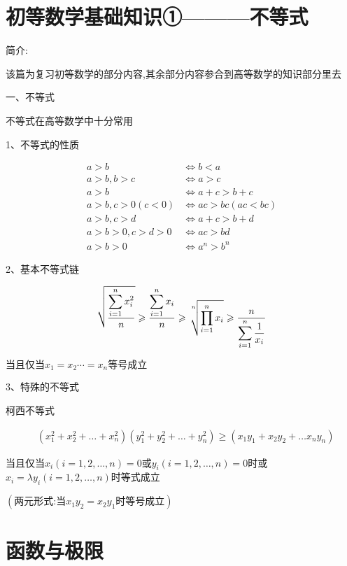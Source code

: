 \documentclass[utf8]{ctexart}
\begin{document}
\linespread{2}

\section*{\heiti 初等数学基础知识①———不等式 }

简介:

该篇为复习初等数学的部分内容,其余部分内容参合到高等数学的知识部分里去

一、不等式

不等式在高等数学中十分常用

1、不等式的性质

\begin{align}
    a>b&\Leftrightarrow b<a\\
    a>b,b>c&\Leftrightarrow a>c\\
    a>b&\Leftrightarrow a+c>b+c\\
    a>b,c>0(c<0)&\Leftrightarrow ac>bc(ac<bc)\\
    a>b,c>d&\Leftrightarrow a+c>b+d\\
    a>b>0,c>d>0&\Leftrightarrow ac>bd\\
    a>b>0&\Leftrightarrow a^{n}>b^{n}
\end{align}

2、基本不等式链

\begin{align}
    \displaystyle\sqrt{\frac{\displaystyle\sum^{n}_{i=1}x_{i}^{2}}{n}}\geqslant\frac{\displaystyle\sum^{n}_{i=1}x_{i}}{n}\geqslant \sqrt[\uproot{16}n]{\displaystyle\prod ^{n}_{i=1}x_{i}} \geqslant \frac{n}{\displaystyle\sum^{n}_{i=1}\frac{1}{x_{i}}}
\end{align}

$\text{当且仅当}x_{1}=x_{2}\cdots =x_{n}\text{等号成立}$

3、特殊的不等式

柯西不等式

\begin{align}
    &\displaystyle (x_{1}^{2}+x_{2}^{2}+\ldots +x_{n}^{2})(y_{1}^{2}+y_{2}^{2}+\ldots +y_{n}^{2})\geqslant (x_{1}y_{1}+x_{2}y_{2}+\ldots x_{n}y_{n})
\end{align}

当且仅当$x_{i}(i=1,2,\ldots ,n)=0$或$y_{i}(i=1,2,\ldots ,n)=0$时或$x_{i}=\lambda y_{i}(i=1,2,\ldots ,n)$时等式成立

$(\text{两元形式:当}x_{1}y_{2}=x_{2}y_{1}\text{时等号成立})$

\newpage

\section{\heiti 函数与极限}
\end{document}
